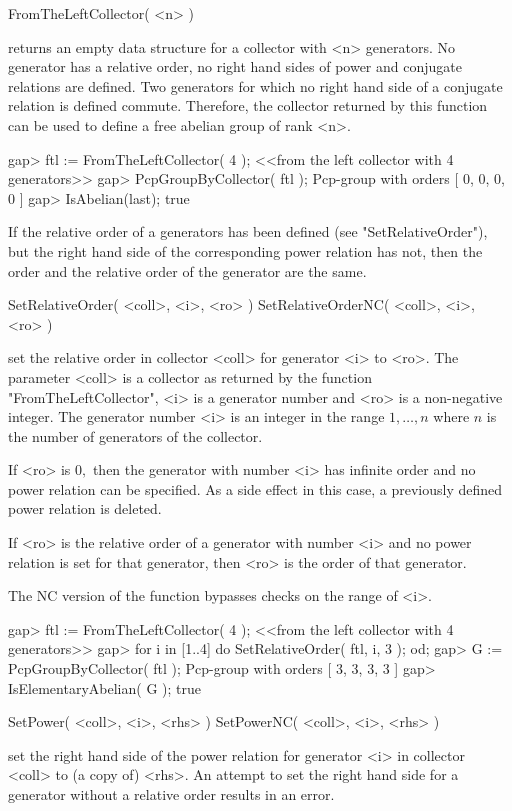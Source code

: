 \>FromTheLeftCollector( <n> )

returns an empty  data structure for a collector  with <n> generators. 
No generator  has a relative order,  no right hand sides  of power and
conjugate relations  are defined.  Two  generators for which  no right
hand side of a conjugate  relation is defined commute.  Therefore, the
collector  returned by  this function  can be  used to  define  a free
abelian group of rank <n>.

\beginexample
gap> ftl := FromTheLeftCollector( 4 );
<<from the left collector with 4 generators>>
gap> PcpGroupByCollector( ftl );
Pcp-group with orders [ 0, 0, 0, 0 ]
gap> IsAbelian(last);
true
\endexample

If the relative order of a generators has been defined (see
"SetRelativeOrder"), but the right hand side of the corresponding
power relation has not, then the order and the relative order of the
generator are the same.

\>SetRelativeOrder( <coll>, <i>, <ro> )
\>SetRelativeOrderNC( <coll>, <i>, <ro> )

set the relative order in collector  <coll> for generator <i> to <ro>. 
The  parameter <coll>  is  a  collector as  returned  by the  function
"FromTheLeftCollector",  <i>  is a  generator  number  and  <ro> is  a
non-negative integer.  The  generator number <i> is an  integer in the
range  $1,\ldots,n$ where  $n$  is  the number  of  generators of  the
collector.

If <ro> is $0,$ then the  generator with number <i> has infinite order
and no  power relation  can be  specified.  As a  side effect  in this
case, a previously defined power relation is deleted.
 
If <ro>  is the relative order of  a generator with number  <i> and no
power relation  is set for that  generator, then <ro> is  the order of
that generator.

The NC version of the function bypasses checks on the range of <i>.

\beginexample
gap> ftl := FromTheLeftCollector( 4 );
<<from the left collector with 4 generators>>
gap> for i in [1..4] do SetRelativeOrder( ftl, i, 3 ); od;
gap> G := PcpGroupByCollector( ftl );
Pcp-group with orders [ 3, 3, 3, 3 ]
gap> IsElementaryAbelian( G );
true
\endexample


\>SetPower( <coll>, <i>, <rhs> )
\>SetPowerNC( <coll>, <i>, <rhs> )

set the  right hand side  of the power  relation for generator  <i> in
collector <coll>  to (a copy of)  <rhs>.  An attempt to  set the right
hand  side for  a generator  without a  relative order  results  in an
error.  

